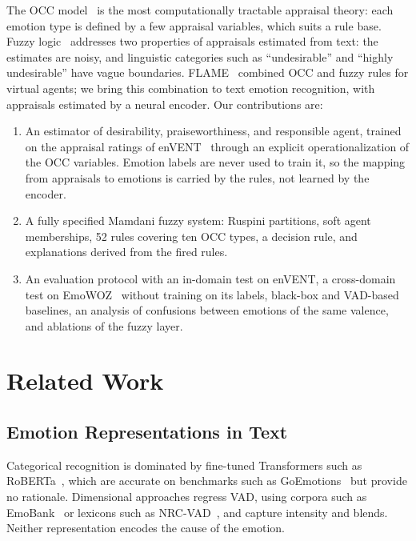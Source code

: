\documentclass[conference, a4paper]{IEEEtran}
\begin{document}
The OCC model~\cite{ortony1988cognitive} is the most computationally tractable appraisal theory: each emotion type is defined by a few appraisal variables, which suits a rule base. Fuzzy logic~\cite{zadeh1965fuzzy} addresses two properties of appraisals estimated from text: the estimates are noisy, and linguistic categories such as ``undesirable'' and ``highly undesirable'' have vague boundaries. FLAME~\cite{elnasr2000flame} combined OCC and fuzzy rules for virtual agents; we bring this combination to text emotion recognition, with appraisals estimated by a neural encoder. Our contributions are:
\begin{enumerate}
    \item An estimator of desirability, praiseworthiness, and responsible agent, trained on the appraisal ratings of enVENT~\cite{troiano2023dimensional} through an explicit operationalization of the OCC variables. Emotion labels are never used to train it, so the mapping from appraisals to emotions is carried by the rules, not learned by the encoder.
    \item A fully specified Mamdani fuzzy system: Ruspini partitions, soft agent memberships, 52 rules covering ten OCC types, a decision rule, and explanations derived from the fired rules.
    \item An evaluation protocol with an in-domain test on enVENT, a cross-domain test on EmoWOZ~\cite{feng2022emowoz} without training on its labels, black-box and VAD-based baselines, an analysis of confusions between emotions of the same valence, and ablations of the fuzzy layer.
\end{enumerate}

\section{Related Work}
\label{sec:related}

\subsection{Emotion Representations in Text}
Categorical recognition is dominated by fine-tuned Transformers such as RoBERTa~\cite{liu2019roberta}, which are accurate on benchmarks such as GoEmotions~\cite{demszky2020goemotions} but provide no rationale. Dimensional approaches regress VAD, using corpora such as EmoBank~\cite{buechel2017emobank} or lexicons such as NRC-VAD~\cite{mohammad2018obtaining}, and capture intensity and blends. Neither representation encodes the cause of the emotion.
\end{document}
